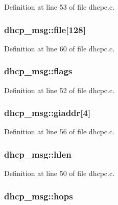 Definition at line 53 of file dhcpc.c.

\hypertarget{structdhcp__msg_aa8a1d58ec7be4c6380327b434cccaa43}{
\subsubsection[{file}]{ {\bf dhcp\_\-msg::file}\mbox{[}128\mbox{]}}}
\label{structdhcp__msg_aa8a1d58ec7be4c6380327b434cccaa43}


Definition at line 60 of file dhcpc.c.

\hypertarget{structdhcp__msg_a5a625add94f828fbbc34f7e77d2458cb}{
\subsubsection[{flags}]{ {\bf dhcp\_\-msg::flags}}}
\label{structdhcp__msg_a5a625add94f828fbbc34f7e77d2458cb}


Definition at line 52 of file dhcpc.c.

\hypertarget{structdhcp__msg_a6ad02bf8a8f27c103b9dea92c55bdfbd}{
\subsubsection[{giaddr}]{ {\bf dhcp\_\-msg::giaddr}\mbox{[}4\mbox{]}}}
\label{structdhcp__msg_a6ad02bf8a8f27c103b9dea92c55bdfbd}


Definition at line 56 of file dhcpc.c.

\hypertarget{structdhcp__msg_a7520521ffd9f53b79e358f3fd2b4efae}{
\subsubsection[{hlen}]{ {\bf dhcp\_\-msg::hlen}}}
\label{structdhcp__msg_a7520521ffd9f53b79e358f3fd2b4efae}


Definition at line 50 of file dhcpc.c.

\hypertarget{structdhcp__msg_acc1bb4e8d3e629e7b6af790329b13682}{
\subsubsection[{hops}]{ {\bf dhcp\_\-msg::hops}}}
\label{structdhcp__msg_acc1bb4e8d3e629e7b6af790329b13682}



